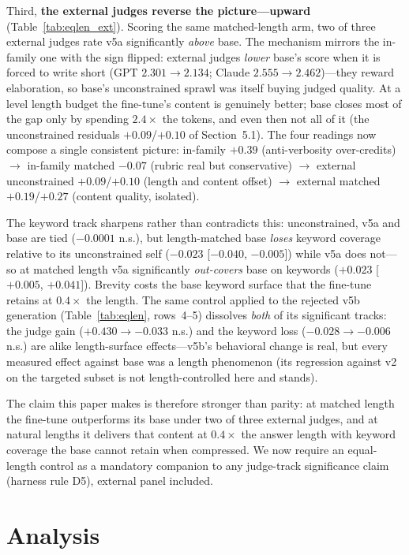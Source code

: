 \documentclass[11pt]{article}
\begin{document}
Third, \textbf{the external judges reverse the picture---upward}
(Table~\ref{tab:eqlen_ext}). Scoring the same matched-length arm, two
of three external judges rate v5a significantly \emph{above} base. The
mechanism mirrors the in-family one with the sign flipped: external
judges \emph{lower} base's score when it is forced to write short
(GPT $2.301 \to 2.134$; Claude $2.555 \to 2.462$)---they reward
elaboration, so base's unconstrained sprawl was itself buying judged
quality. At a level length budget the fine-tune's content is genuinely
better; base closes most of the gap only by spending $2.4\times$ the
tokens, and even then not all of it (the unconstrained residuals
$+0.09$/$+0.10$ of Section~5.1). The four readings now compose a
single consistent picture: in-family $+0.39$ (anti-verbosity
over-credits) $\to$ in-family matched $-0.07$ (rubric real but
conservative) $\to$ external unconstrained $+0.09$/$+0.10$ (length and
content offset) $\to$ external matched $+0.19$/$+0.27$ (content
quality, isolated).

The keyword track sharpens rather than
contradicts this: unconstrained, v5a and base are tied ($-0.0001$
n.s.), but length-matched base \emph{loses} keyword coverage relative
to its unconstrained self ($-0.023$ [$-0.040$, $-0.005$]) while v5a
does not---so at matched length v5a significantly \emph{out-covers}
base on keywords ($+0.023$ [$+0.005$, $+0.041$]). Brevity costs the
base keyword surface that the fine-tune retains at $0.4\times$ the
length. The same control applied to the rejected v5b generation
(Table~\ref{tab:eqlen}, rows~4--5) dissolves \emph{both} of its
significant tracks: the judge gain ($+0.430 \to -0.033$ n.s.) and the
keyword loss ($-0.028 \to -0.006$ n.s.) are alike length-surface
effects---v5b's behavioral change is real, but every measured effect
against base was a length phenomenon (its regression against v2 on the
targeted subset is not length-controlled here and stands).

The claim this paper makes is therefore stronger than parity: at
matched length the fine-tune outperforms its base under two of three
external judges, and at natural lengths it delivers that content at
$0.4\times$ the answer length with keyword coverage the base cannot
retain when compressed. We now require an equal-length control as a
mandatory companion to any judge-track significance claim (harness
rule D5), external panel included.

\section{Analysis}
\label{sec:analysis}
\end{document}

